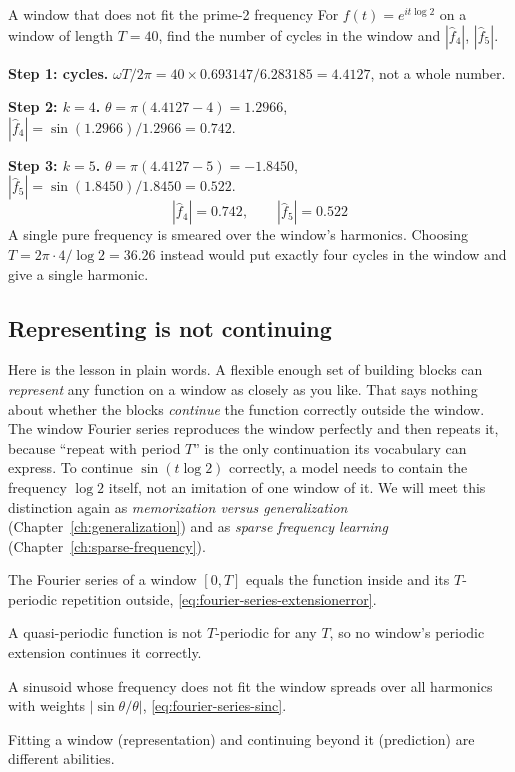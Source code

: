 \begin{sample}{A window that does not fit the prime-2 frequency}
For $f(t)=e^{it\log2}$ on a window of length $T=40$, find the number of cycles in the window and $|\hat f_4|$, $|\hat f_5|$.

\textbf{Step 1: cycles.} $\omega T/2\pi=40\times0.693147/6.283185=4.4127$, not a whole number.

\textbf{Step 2: $k=4$.} $\theta=\pi(4.4127-4)=1.2966$, $|\hat f_4|=\sin(1.2966)/1.2966=0.742$.

\textbf{Step 3: $k=5$.} $\theta=\pi(4.4127-5)=-1.8450$, $|\hat f_5|=\sin(1.8450)/1.8450=0.522$.
\[
\boxed{|\hat f_4|=0.742,\qquad|\hat f_5|=0.522}
\]
A single pure frequency is smeared over the window's harmonics. Choosing $T=2\pi\cdot4/\log 2=36.26$ instead would put exactly four cycles in the window and give a single harmonic.
\end{sample}

\subsection{Representing is not continuing}

Here is the lesson in plain words. A flexible enough set of building blocks can \emph{represent} any function on a window as closely as you like. That says nothing about whether the blocks \emph{continue} the function correctly outside the window. The window Fourier series reproduces the window perfectly and then repeats it, because ``repeat with period $T$'' is the only continuation its vocabulary can express. To continue $\sin(t\log2)$ correctly, a model needs to contain the frequency $\log2$ itself, not an imitation of one window of it. We will meet this distinction again as \emph{memorization versus generalization} (Chapter~\ref{ch:generalization}) and as \emph{sparse frequency learning} (Chapter~\ref{ch:sparse-frequency}).

\begin{keyideas}
\item The Fourier series of a window $[0,T]$ equals the function inside and its $T$-periodic repetition outside, \cref{eq:fourier-series-extensionerror}.
\item A quasi-periodic function is not $T$-periodic for any $T$, so no window's periodic extension continues it correctly.
\item A sinusoid whose frequency does not fit the window spreads over all harmonics with weights $|\sin\theta/\theta|$, \cref{eq:fourier-series-sinc}.
\item Fitting a window (representation) and continuing beyond it (prediction) are different abilities.
\end{keyideas}

